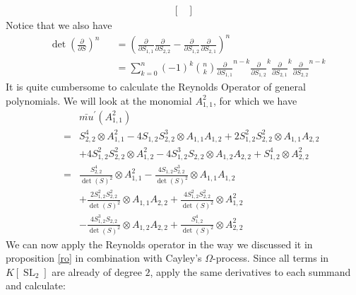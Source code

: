 \begin{example}
\begin{equation}
\begin{aligned}
\begin{bmatrix}
      \end{bmatrix}
    \end{aligned}
  \end{equation}
  Notice that we also have
  \begin{equation}
    \begin{aligned}
      &\operatorname{det}\left( \frac{\partial}{\partial S} \right)^n
      &&= \left( \frac{\partial}{\partial S_{1,1}} \frac{\partial}{\partial S_{2,2}} - \frac{\partial}{\partial S_{1,2}} \frac{\partial}{\partial S_{2,1}} \right)^n \\
      &&&= \sum_{k=0}^n (-1)^k \binom{n}{k} \frac{\partial}{\partial S_{1,1}}^{n-k} \frac{\partial}{\partial S_{1,2}}^k \frac{\partial}{\partial S_{2,1}}^k \frac{\partial}{\partial S_{2,2}}^{n-k}
    \end{aligned}
  \end{equation}
  It is quite cumbersome to calculate the Reynolds Operator of general polynomials.
  We will look at the monomial $A_{1,1}^2$, for which we have
  \begin{equation}
    \begin{aligned}
      &&&\bar{mu}^\prime (A_{1,1}^2) \\
      &&=& S_{2,2}^4 \otimes A_{1,1}^2 - 4S_{1,2}S_{2,2}^3 \otimes A_{1,1}A_{1,2} + 2S_{1,2}^2 S_{2,2}^2 \otimes A_{1,1}A_{2,2} \\
      &&& + 4S_{1,2}^2 S_{2,2}^2 \otimes A_{1,2}^2 - 4S_{1,2}^3 S_{2,2} \otimes A_{1,2}A_{2,2} + S_{1,2}^4 \otimes A_{2,2}^2\\
      &&=& \frac{S_{2,2}^4}{\operatorname{det}(S)^2} \otimes A_{1,1}^2 - \frac{4S_{1,2}S_{2,2}^3}{\operatorname{det}(S)^2} \otimes A_{1,1}A_{1,2} \\
      &&& + \frac{2S_{1,2}^2 S_{2,2}^2}{\operatorname{det}(S)^2} \otimes A_{1,1}A_{2,2} + \frac{4S_{1,2}^2 S_{2,2}^2}{\operatorname{det}(S)^2} \otimes A_{1,2}^2 \\
      &&& - \frac{4S_{1,2}^3 S_{2,2}}{\operatorname{det}(S)^2} \otimes A_{1,2}A_{2,2} + \frac{S_{1,2}^4}{\operatorname{det}(S)^2} \otimes A_{2,2}^2
    \end{aligned}
  \end{equation}
  We can now apply the Reynolds operator in the way we discussed it in proposition \ref{ro} in combination with Cayley's $\Omega$-process.
  Since all terms in $K[\operatorname{SL}_2]$ are already of degree $2$, apply the same derivatives to each summand and calculate:
  \begin{equation}
    \begin{aligned}

\end{aligned}
\end{equation}
\end{example}
